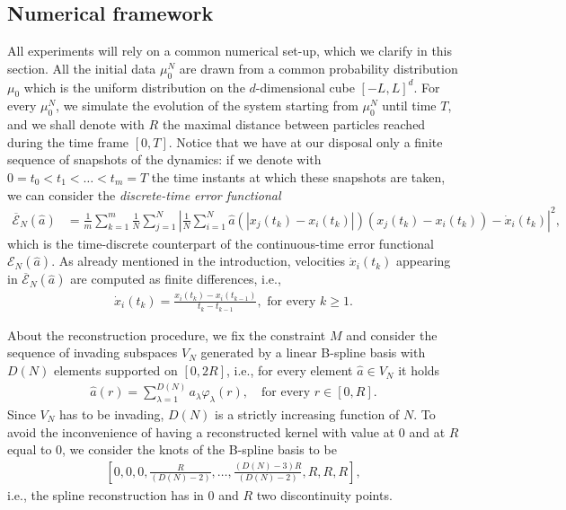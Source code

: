 \subsection{Numerical framework}\label{numfram}

All experiments will rely on a common numerical set-up, which we clarify in this section. All the initial data $\mu^N_0$ are drawn from a common probability distribution $\mu_0$ which is the uniform distribution on the $d$-dimensional cube $[-L,L]^d$. For every $\mu^N_0$, we simulate the evolution of the system starting from $\mu^N_0$ until time $T$, and we shall denote with $R$ the maximal distance between particles reached during the time frame $[0,T]$. Notice that we have at our disposal only a finite sequence of snapshots of the dynamics: if we denote with $0 = t_0 < t_1 < \ldots < t_m = T$ the time instants at which these snapshots are taken, we can consider the \textit{discrete-time error functional}
\begin{align*}
\overline{\mathcal{E}}_N(\widehat{a}) & = \frac{1}{m} \sum^m_{k = 1} \frac{1}{N} \sum^N_{j = 1} \left| \frac{1}{N} \sum^N_{i = 1} \widehat{a}(|x_j(t_k) - x_i(t_k)|)(x_j(t_k) - x_i(t_k)) - \dot{x}_i(t_k)\right|^2,
\end{align*}
which is the time-discrete counterpart of the continuous-time error functional $\mathcal{E}_N(\widehat{a})$. As already mentioned in the introduction, velocities $\dot{x}_i(t_k)$ appearing in $\overline{\mathcal{E}}_N(\widehat{a})$ are computed as finite differences, i.e.,
\begin{align*}
\dot{x}_i(t_k) = \frac{x_i(t_k) - x_i(t_{k-1})}{t_k - t_{k-1}}, \text{ for every } k \geq 1.
\end{align*}

About the reconstruction procedure, we fix the constraint $M$ and consider the sequence of invading subspaces $V_N$ generated by a linear B-spline basis with $D(N) $ elements supported on $[0,2R]$, i.e., for every element $\widehat{a} \in V_N$ it holds
\begin{align*}
	\widehat{a}(r) = \sum^{D(N)}_{\lambda = 1} a_{\lambda} \varphi_{\lambda}(r), \quad \text{for every } r \in [0,R].
\end{align*}
Since $V_N$ has to be invading, $D(N)$ is a strictly increasing function of $N$. To avoid the inconvenience of having a reconstructed kernel with value at $0$ and at $R$ equal to $0$, we consider the knots of the B-spline basis to be
\begin{align}\label{eq:knots}
\left[0,0,0,\frac{R}{(D(N)-2)},\ldots,\frac{(D(N) - 3)R}{(D(N)-2)},R,R,R\right],
\end{align}
i.e., the spline reconstruction has in $0$ and $R$ two discontinuity points.


